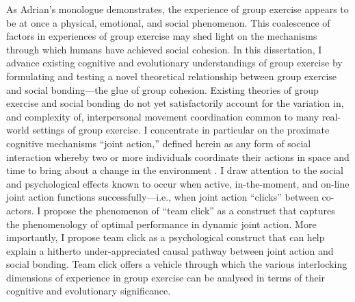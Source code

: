 \begin{CJK}{UTF8}{gbsn}
As Adrian's monologue demonstrates, the experience of group exercise appears to be at once a physical, emotional, and social phenomenon.  This coalescence of factors in experiences of group exercise may shed light on the mechanisms through which humans have achieved social cohesion.  In  this dissertation, I advance existing cognitive and evolutionary understandings of group exercise by formulating and testing a novel theoretical relationship between group exercise and social bonding---the glue of group cohesion.  Existing theories of group exercise and social bonding do not yet satisfactorily account for the variation in, and complexity of, interpersonal movement coordination common to many real-world settings of group exercise.  I concentrate in particular on the proximate cognitive mechanisms  ``joint action,'' defined herein as any form of social interaction whereby two or more individuals coordinate their actions in space and time to bring about a change in the environment \citep{Sebanz2006}.  I draw attention to the social and psychological effects known to occur when active, in-the-moment, and on-line joint action functions successfully---i.e., when joint action ``clicks'' between co-actors.  I propose the phenomenon of ``team click'' as a construct that captures the phenomenology of optimal performance in dynamic joint action.  More importantly, I propose team click as a psychological construct that can help explain a hitherto under-appreciated causal pathway between joint action and social bonding.  Team click offers a vehicle through which the various interlocking dimensions of experience in group exercise can be analysed in terms of their cognitive and evolutionary significance.



\end{CJK}
